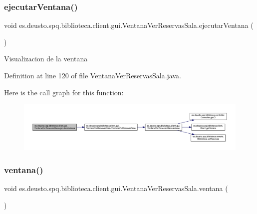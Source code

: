 \subsubsection{\texorpdfstring{ejecutar\+Ventana()}{ejecutarVentana()}}
{\footnotesize\ttfamily void es.\+deusto.\+spq.\+biblioteca.\+client.\+gui.\+Ventana\+Ver\+Reservas\+Sala.\+ejecutar\+Ventana (\begin{DoxyParamCaption}{ }\end{DoxyParamCaption})}

Visualizacion de la ventana 

Definition at line 120 of file Ventana\+Ver\+Reservas\+Sala.\+java.

Here is the call graph for this function\+:
\nopagebreak
\begin{figure}[H]
\begin{center}
\leavevmode
\includegraphics[width=350pt]{classes_1_1deusto_1_1spq_1_1biblioteca_1_1client_1_1gui_1_1_ventana_ver_reservas_sala_a405dbde710635ada1ad7c4514cda6ff6_cgraph}
\end{center}
\end{figure}
\mbox{\label{classes_1_1deusto_1_1spq_1_1biblioteca_1_1client_1_1gui_1_1_ventana_ver_reservas_sala_a0530d61d6fe002ba70b7a520c5cec330}} 
\subsubsection{\texorpdfstring{ventana()}{ventana()}}
{\footnotesize\ttfamily void es.\+deusto.\+spq.\+biblioteca.\+client.\+gui.\+Ventana\+Ver\+Reservas\+Sala.\+ventana (\begin{DoxyParamCaption}{ }\end{DoxyParamCaption})}


